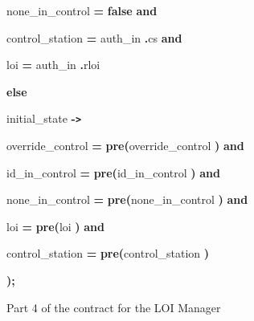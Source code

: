 \begin{figure}
{{none\_in\_control {\color{color18} \textbf{=}} {\color{color18} \textbf{false}} 
{\color{color18} \textbf{and      }}

control\_station {\color{color18} \textbf{=}} auth\_in{\color{color18} \textbf{.}}cs 
{\color{color18} \textbf{and      }}

loi {\color{color18} \textbf{=}} auth\_in{\color{color18} \textbf{.}}rloi    

\parindent=0pt
{\color{color18} \textbf{else      }}

\parindent=21pt
initial\_state {\color{color18} \textbf{-\texttt{>}      }}

override\_control {\color{color18} \textbf{=}} {\color{color18} \textbf{pre(}}override\_control{\color{color18} \textbf{)}} 
{\color{color18} \textbf{and      }}

id\_in\_control {\color{color18} \textbf{=}} {\color{color18} \textbf{pre(}}id\_in\_control{\color{color18} \textbf{)}} 
{\color{color18} \textbf{and      }}

none\_in\_control {\color{color18} \textbf{=}} {\color{color18} \textbf{pre(}}none\_in\_control{\color{color18} \textbf{)}} 
{\color{color18} \textbf{and      }}

loi {\color{color18} \textbf{=}} {\color{color18} \textbf{pre(}}loi{\color{color18} \textbf{)}} 
{\color{color18} \textbf{and      }}

\parindent=7pt
control\_station {\color{color18} \textbf{=}} {\color{color18} \textbf{pre(}}control\_station{\color{color18} \textbf{) 
     }}

\parindent=0pt
{\color{color18} \textbf{);      }}

}%
}
\caption{Part 4 of the contract for the LOI Manager}
\label{fig:loi-contract4}
\end{figure}

